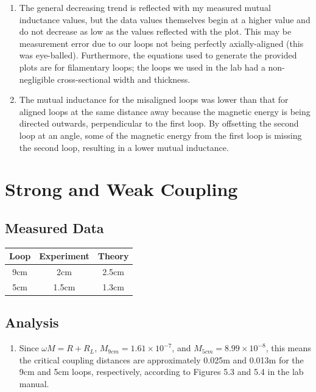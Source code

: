 \documentclass{article}
\begin{document}
\begin{enumerate}
	\item The general decreasing trend is reflected with my measured mutual inductance values, but the data values themselves begin at a higher value and do not decrease as low as the values reflected with the plot. This may be measurement error due to our loops not being perfectly axially-aligned (this was eye-balled). Furthermore, the equations used to generate the provided plots are for filamentary loops; the loops we used in the lab had a non-negligible cross-sectional width and thickness.

	\item The mutual inductance for the misaligned loops was lower than that for aligned loops at the same distance away because the magnetic energy is being directed outwards, perpendicular to the first loop. By offsetting the second loop at an angle, some of the magnetic energy from the first loop is missing the second loop, resulting in a lower mutual inductance.
\end{enumerate}


\section{Strong and Weak Coupling}

\subsection{Measured Data}
\begin{table}[H]
\centering
\begin{tabular}{|c|c|c|}
\hline
Loop & Experiment & Theory \\ \hline
9cm & 2cm & 2.5cm\\ \hline
5cm & 1.5cm & 1.3cm\\ \hline
\end{tabular}
\end{table}

\subsection{Analysis}

\begin{enumerate}
	\item Since $\omega M = R + R_L$, $M_{9cm} = 1.61\times10^{-7}$, and $M_{5cm} = 8.99\times10^{-8}$,  this means the critical coupling distances are approximately 0.025m and 0.013m for the 9cm and 5cm loops, respectively, according to Figures 5.3 and 5.4 in the lab manual.
\end{enumerate}
\end{document}
